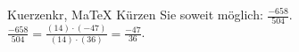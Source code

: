 \begin{MAufgabe}{Kuerzen}{kr, MaTeX}
K\"urzen Sie soweit m\"oglich: $\frac{-658}{504}$.\\ 
\ifLsg\MLoesung
\quad $\frac{-658}{504}=\frac{(14)\cdot(-47)}{(14)\cdot(36)}=\frac{-47}{36}$.\else\relax\fi
 \end{MAufgabe}